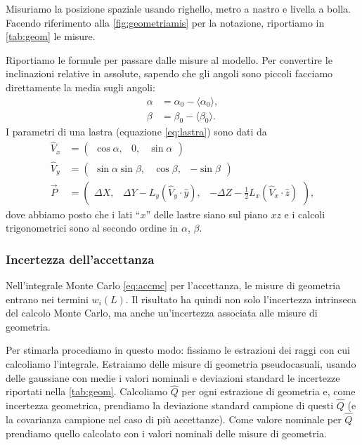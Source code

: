 Misuriamo la posizione spaziale usando righello, metro a nastro e livella a bolla.
Facendo riferimento alla \autoref{fig:geometriamis} per la notazione, riportiamo
in \autoref{tab:geom} le misure.

Riportiamo le formule per passare dalle misure al modello.
Per convertire le inclinazioni relative in assolute,
sapendo che gli angoli sono piccoli facciamo direttamente la media sugli angoli:
\begin{align*}
	\alpha &= \alpha_0 - \langle\alpha_0\rangle, \\
	\beta  &= \beta_0  - \langle\beta_0\rangle.
\end{align*}
I parametri di una lastra (equazione \ref{eq:lastra}) sono dati da
\begin{align*}
	\hat V_x &= \begin{pmatrix}
		\cos\alpha, & 0, & \sin\alpha
	\end{pmatrix} \\
	\hat V_y &= \begin{pmatrix}
		\sin\alpha\sin\beta, & \cos\beta, & -\sin\beta
	\end{pmatrix} \\
	\vec P &= \begin{pmatrix}
		\Delta X, & \Delta Y - L_y(\hat V_y\cdot\hat y), & -\Delta Z - \frac12 L_x(\hat V_x\cdot\hat z)
	\end{pmatrix},
\end{align*}
dove abbiamo posto che i lati ``$x$'' delle lastre siano sul piano $xz$
e i calcoli trigonometrici sono al secondo ordine in $\alpha$, $\beta$.

\subsubsection{Incertezza dell'accettanza}
\label{sec:uncgeom}

Nell'integrale Monte Carlo \eqref{eq:accmc} per l'accettanza,
le misure di geometria entrano nei termini $w_i(L)$.
Il risultato ha quindi non solo l'incertezza intrinseca del calcolo Monte Carlo,
ma anche un'incertezza associata alle misure di geometria.

Per stimarla procediamo in questo modo:
fissiamo le estrazioni dei raggi con cui calcoliamo l'integrale.
Estraiamo delle misure di geometria pseudocasuali,
usando delle gaussiane con medie i valori nominali e deviazioni standard le incertezze
riportati nella \autoref{tab:geom}.
Calcoliamo $\hat Q$ per ogni estrazione di geometria e, come incertezza geometrica,
prendiamo la deviazione standard campione di questi $\hat Q$
(e la covarianza campione nel caso di più accettanze).
Come valore nominale per $\hat Q$ prendiamo quello calcolato con i valori nominali delle misure di geometria.
